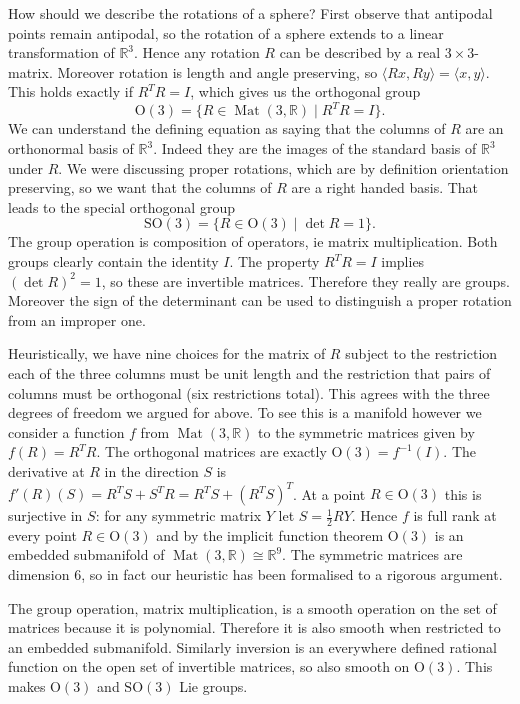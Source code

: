 \documentclass[twoside,11pt,a4paper,leqno]{article}
\numberwithin{equation}{section}
\theoremstyle{plain}
\theoremstyle{definition}
\DeclareMathOperator{\Mat}{Mat}
\newcommand{\bbR}{\mathbb{R}}
\renewcommand{\O}{\mathrm{O}}
\newcommand{\SO}{\mathrm{SO}}
\begin{document}
How should we describe the rotations of a sphere?
First observe that antipodal points remain antipodal, so the rotation of a sphere extends to a linear transformation of $\bbR^3$.
Hence any rotation $R$ can be described by a real $3\times 3$-matrix.
Moreover rotation is length and angle preserving, so $\langle Rx, Ry \rangle = \langle x, y \rangle$.
This holds exactly if $R^TR = I$, which gives us the orthogonal group
\[
\O(3) = \{ R \in \Mat(3,\bbR) \mid R^TR = I \}.
\]
We can understand the defining equation as saying that the columns of $R$ are an orthonormal basis of $\bbR^3$.
Indeed they are the images of the standard basis of $\bbR^3$ under $R$.
We were discussing proper rotations, which are by definition orientation preserving, so we want that the columns of $R$ are a right handed basis.
That leads to the special orthogonal group
\[
\SO(3) = \{ R \in \O(3) \mid \det R = 1 \}.
\]
The group operation is composition of operators, ie matrix multiplication.
Both groups clearly contain the identity $I$.
The property $R^T R = I$ implies $(\det R)^2 = 1$, so these are invertible matrices.
Therefore they really are groups.
Moreover the sign of the determinant can be used to distinguish a proper rotation from an improper one.

Heuristically, we have nine choices for the matrix of $R$ subject to the restriction each of the three columns must be unit length and the restriction that pairs of columns must be orthogonal (six restrictions total).
This agrees with the three degrees of freedom we argued for above.
To see this is a manifold however we consider a function $f$ from $\Mat(3,\bbR)$ to the symmetric matrices given by $f(R) = R^TR$.
The orthogonal matrices are exactly $\O(3) = f^{-1}(I)$.
The derivative at $R$ in the direction $S$ is $f'(R)(S) = R^TS + S^T R = R^T S + (R^T S)^T$.
At a point $R \in \O(3)$ this is surjective in $S$: for any symmetric matrix $Y$ let $S = \frac{1}{2}RY$.
Hence $f$ is full rank at every point $R \in \O(3)$ and by the implicit function theorem $\O(3)$ is an embedded submanifold of $\Mat(3,\bbR) \cong \bbR^9$.
The symmetric matrices are dimension $6$, so in fact our heuristic has been formalised to a rigorous argument.

The group operation, matrix multiplication, is a smooth operation on the set of matrices because it is polynomial.
Therefore it is also smooth when restricted to an embedded submanifold.
Similarly inversion is an everywhere defined rational function on the open set of invertible matrices, so also smooth on $\O(3)$.
This makes $\O(3)$ and $\SO(3)$ Lie groups.
\end{document}
